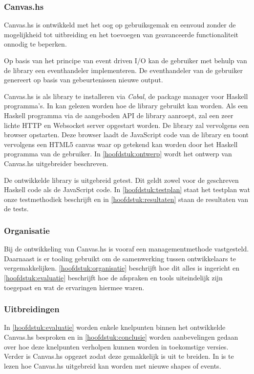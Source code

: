 \subsubsection{Canvas.hs}
Canvas.hs is ontwikkeld met het oog op gebruiksgemak en eenvoud zonder de mogelijkheid tot uitbreiding en het toevoegen van geavanceerde functionaliteit onnodig te beperken. 

Op basis van het principe van event driven I/O kan de gebruiker met behulp van de library een eventhandeler implementeren. De eventhandeler van de gebruiker genereert op basis van gebeurtenissen nieuwe output.

Canvas.hs is als library te installeren via \emph{Cabal}, de package manager voor Haskell programma's. In  kan gelezen worden hoe de library gebruikt kan worden. Als een Haskell programma via de aangeboden API de library aanroept, zal een zeer lichte HTTP en Websocket server opgestart worden. De library zal vervolgens een browser opstarten. Deze browser laadt de JavaScript code van de library en toont vervolgens een HTML5 canvas waar op getekend kan worden door het Haskell programma van de gebruiker. In \autoref{hoofdstuk:ontwerp} wordt het ontwerp van Canvas.hs uitgebreider beschreven.

De ontwikkelde library is uitgebreid getest. Dit geldt zowel voor de geschreven Haskell code als de JavaScript code. In \autoref{hoofdstuk:testplan} staat het testplan wat onze testmethodiek beschrijft en in \autoref{hoofdstuk:resultaten} staan de resultaten van de tests.

\subsubsection{Organisatie}
Bij de ontwikkeling van Canvas.hs is vooraf een managementmethode vastgesteld. Daarnaast is er tooling gebruikt om de samenwerking tussen ontwikkelaars te vergemakkelijken. \autoref{hoofdstuk:organisatie} beschrijft hoe dit alles is ingericht en \autoref{hoofdstuk:evaluatie} beschrijft hoe de afspraken en tools uiteindelijk zijn toegepast en wat de ervaringen hiermee waren.

\subsubsection{Uitbreidingen}
In \autoref{hoofdstuk:evaluatie} worden enkele knelpunten binnen het ontwikkelde Canvas.hs besproken en in \autoref{hoofdstuk:conclusie} worden aanbevelingen gedaan over hoe deze knelpunten verholpen kunnen worden in toekomstige versies. Verder is Canvas.hs opgezet zodat deze gemakkelijk is uit te breiden. In  is te lezen hoe Canvas.hs uitgebreid kan worden met nieuwe shapes of events.


